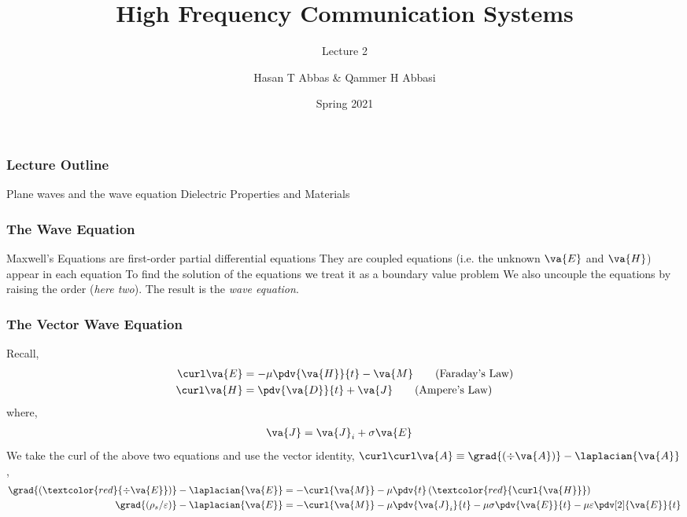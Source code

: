 \documentclass[10pt, compress]{beamer}
\title{High Frequency Communication Systems}
\subtitle{Lecture 2}
\date{Spring 2021}
\author{Hasan T Abbas \& Qammer H Abbasi}
\newcommand{\E}{\varepsilon}  %
\renewcommand{\u}{\mu}  %
\newcommand{\p}{\rho}  %
\begin{document}
\maketitle

\begin{frame}[fragile]
  \frametitle{Lecture Outline}
\begin{outline}[itemize]
  \1 Plane waves and the wave equation
  \1 Dielectric Properties and Materials
  \1 \color{red}{Nanoscale Electromagnetics}
\end{outline}
\end{frame}
\begin{frame}[fragile]
\frametitle{The Wave Equation}
\begin{outline}
  \1 Maxwell's Equations are first-order partial differential equations
    \2 They are coupled equations (i.e. the unknown $\va{E}$ and $\va{H}$) appear in each equation
  \1 To find the solution of the equations we treat it as a boundary value problem
  \1 We also uncouple the equations by raising the order (\textit{here two}).
  \1 The result is the \textit{wave equation}.
\end{outline}
\end{frame}



\begin{frame}[fragile]
  \frametitle{The Vector Wave Equation}
Recall,
\begin{align*}
  \curl \va{E} &= -\u \pdv{\va{H}}{t} - \va{M} \tag{Faraday's Law}\\
\curl \va{H} &= \pdv{\va{D}}{t} + \va{J} \tag{Ampere's Law} \\
\end{align*}
where,
\begin{align*}
  \va{J} &= \va{J}_i + \sigma \va{E}
\end{align*}
We take the curl of the above two equations and use the vector identity, $\curl \curl \va{A} \equiv \grad{(\div \va{A})} - \laplacian{\va{A}}$,
\begin{align*}
  \grad{(\textcolor{red}{\div \va{E}})}   - \laplacian{\va{E}} &= - \curl{\va{M}} - \u \pdv{t}
  \left( \textcolor{red}{\curl{\va{H}}}  \right)  \\
  \grad{(\p_s /\E)} - \laplacian{\va{E}} &= -\curl{\va{M}} - \u \pdv{\va{J}_i}{t} - \u \sigma \pdv{\va{E}}{t} - \u \E \pdv[2]{\va{E}}{t}
\end{align*}
\end{frame}
\end{document}
